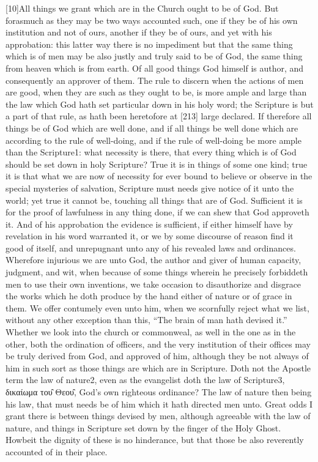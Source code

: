 [10]All things we grant which are in the Church ought to be of God. But forasmuch as they may be two ways accounted such, one if they be of his own institution and not of ours, another if they be of ours, and yet with his approbation: this latter way there is no impediment but that the same thing which is of men may be also justly and truly said to be of God, the same thing from heaven which is from earth. Of all good things God himself is author, and consequently an approver of them. The rule to discern when the actions of men are good, when they are such as they ought to be, is more ample and large than the law which God hath set particular down in his holy word; the Scripture is but a part of that rule, as hath been heretofore at [213] large declared. If therefore all things be of God which are well done, and if all things be well done which are according to the rule of well-doing, and if the rule of well-doing be more ample than the Scripture1: what necessity is there, that every thing which is of God should be set down in holy Scripture? True it is in things of some one kind; true it is that what we are now of necessity for ever bound to believe or observe in the special mysteries of salvation, Scripture must needs give notice of it unto the world; yet true it cannot be, touching all things that are of God. Sufficient it is for the proof of lawfulness in any thing done, if we can shew that God approveth it. And of his approbation the evidence is sufficient, if either himself have by revelation in his word warranted it, or we by some discourse of reason find it good of itself, and unrepugnant unto any of his revealed laws and ordinances. Wherefore injurious we are unto God, the author and giver of human capacity, judgment, and wit, when because of some things wherein he precisely forbiddeth men to use their own inventions, we take occasion to disauthorize and disgrace the works which he doth produce by the hand either of nature or of grace in them. We offer contumely even unto him, when we scornfully reject what we list, without any other exception than this, “The brain of man hath devised it.” Whether we look into the church or commonweal, as well in the one as in the other, both the ordination of officers, and the very institution of their offices may be truly derived from God, and approved of him, although they be not always of him in such sort as those things are which are in Scripture. Doth not the Apostle term the law of nature2, even as the evangelist doth the law of Scripture3, δικαίωμα του̑ Θεου̑, God’s own righteous ordinance? The law of nature then being his law, that must needs be of him which it hath directed men unto. Great odds I grant there is between things devised by men, although agreeable with the law of nature, and things in Scripture set down by the finger of the Holy Ghost. Howbeit the dignity of these is no hinderance, but that those be also reverently accounted of in their place.


